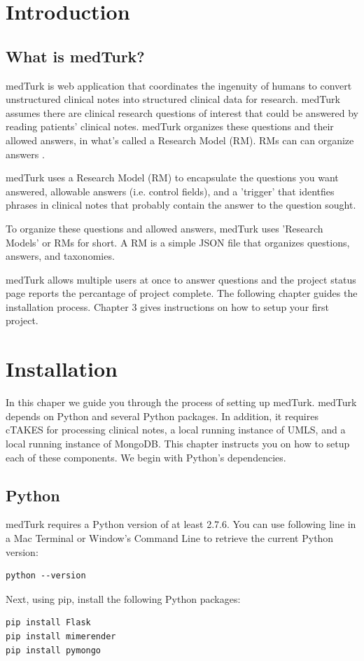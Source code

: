 \documentclass{book}
\begin{document}
\tableofcontents

\mainmatter

\chapter{Introduction}

\section{What is medTurk?}
medTurk is web application that coordinates the ingenuity of humans to convert unstructured clinical notes into structured clinical data for research. medTurk assumes there are clinical research questions of interest that could be answered by reading patients' clinical notes. medTurk organizes these questions and their allowed answers, in what's called a Research Model (RM). RMs can can organize answers .

medTurk uses a Research Model (RM) to encapsulate the questions you want answered, allowable answers (i.e. control fields), and a 'trigger' that identfies phrases in clinical notes that probably contain the answer to the question sought.

To organize these questions and allowed answers, medTurk uses 'Research Models' or RMs for short. A RM is a simple JSON file that organizes questions, answers, and taxonomies.

medTurk allows multiple users at once to answer questions and the project status page reports the percantage of project complete. The following chapter guides the installation process. Chapter 3 gives instructions on how to setup your first project.


\chapter{Installation}
In this chaper we guide you through the process of setting up medTurk. medTurk depends on Python and several Python packages. In addition, it requires cTAKES for processing clinical notes, a local running instance of UMLS, and a local running instance of MongoDB. This chapter instructs you on how to setup each of these components. We begin with Python's dependencies.

\section{Python}
medTurk requires a Python version of at least 2.7.6. You can use following line in a Mac Terminal or Window's Command Line to retrieve the current Python version:
\begin{verbatim}
python --version
\end{verbatim}
Next, using pip, install the following Python packages:
\begin{verbatim}
pip install Flask
pip install mimerender
pip install pymongo
\end{verbatim}
\end{document}
